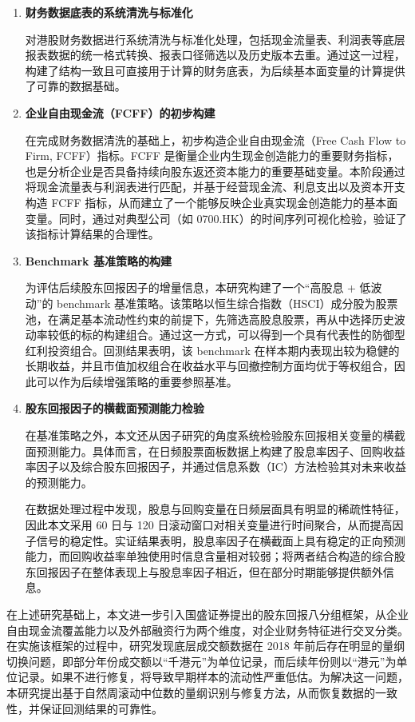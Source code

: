 \documentclass[a4paper,10pt]{article}
\begin{document}
\begin{enumerate}

\item \textbf{财务数据底表的系统清洗与标准化}

对港股财务数据进行系统清洗与标准化处理，包括现金流量表、利润表等底层报表数据的统一格式转换、报表口径筛选以及历史版本去重。通过这一过程，构建了结构一致且可直接用于计算的财务底表，为后续基本面变量的计算提供了可靠的数据基础。

\item \textbf{企业自由现金流（FCFF）的初步构建}

在完成财务数据清洗的基础上，初步构造企业自由现金流（Free Cash Flow to Firm, FCFF）指标。FCFF 是衡量企业内生现金创造能力的重要财务指标，也是分析企业是否具备持续向股东返还资本能力的重要基础变量。本阶段通过将现金流量表与利润表进行匹配，并基于经营现金流、利息支出以及资本开支构造 FCFF 指标，从而建立了一个能够反映企业真实现金创造能力的基本面变量。同时，通过对典型公司（如 0700.HK）的时间序列可视化检验，验证了该指标计算结果的合理性。

\item \textbf{Benchmark 基准策略的构建}

为评估后续股东回报因子的增量信息，本研究构建了一个“高股息 + 低波动”的 benchmark 基准策略。该策略以恒生综合指数（HSCI）成分股为股票池，在满足基本流动性约束的前提下，先筛选高股息股票，再从中选择历史波动率较低的标的构建组合。通过这一方式，可以得到一个具有代表性的防御型红利投资组合。回测结果表明，该 benchmark 在样本期内表现出较为稳健的长期收益，并且市值加权组合在收益水平与回撤控制方面均优于等权组合，因此可以作为后续增强策略的重要参照基准。

\item \textbf{股东回报因子的横截面预测能力检验}

在基准策略之外，本文还从因子研究的角度系统检验股东回报相关变量的横截面预测能力。具体而言，在日频股票面板数据上构建了股息率因子、回购收益率因子以及综合股东回报因子，并通过信息系数（IC）方法检验其对未来收益的预测能力。

在数据处理过程中发现，股息与回购变量在日频层面具有明显的稀疏性特征，因此本文采用 60 日与 120 日滚动窗口对相关变量进行时间聚合，从而提高因子信号的稳定性。实证结果表明，股息率因子在横截面上具有稳定的正向预测能力，而回购收益率单独使用时信息含量相对较弱；将两者结合构造的综合股东回报因子在整体表现上与股息率因子相近，但在部分时期能够提供额外信息。

\end{enumerate}

在上述研究基础上，本文进一步引入国盛证券提出的股东回报八分组框架，从企业自由现金流覆盖能力以及外部融资行为两个维度，对企业财务特征进行交叉分类。在实施该框架的过程中，研究发现底层成交额数据在 2018 年前后存在明显的量纲切换问题，即部分年份成交额以“千港元”为单位记录，而后续年份则以“港元”为单位记录。如果不进行修复，将导致早期样本的流动性严重低估。为解决这一问题，本研究提出基于自然周滚动中位数的量纲识别与修复方法，从而恢复数据的一致性，并保证回测结果的可靠性。
\end{document}
